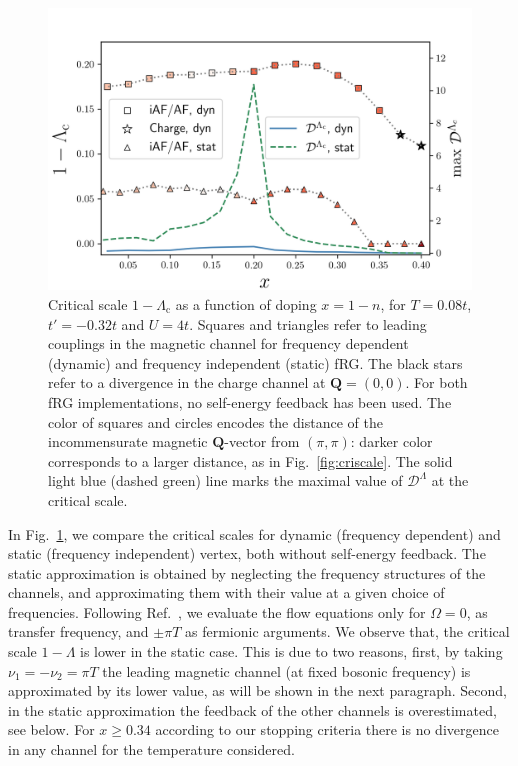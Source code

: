 \begin{figure}
\includegraphics[width=0.5 \textwidth]{images/phasediag_static.png}
\caption{Critical scale $1-\Lambda_{\mathrm{c}}$ as a function of doping $x=1-n$, for $T = 0.08t$, $t'=-0.32t$ and $U=4t$. 
Squares and triangles refer to leading couplings in the magnetic channel for frequency dependent (dynamic) and frequency independent (static) fRG. The black stars refer to a divergence in the charge channel at $\mathbf{Q} = (0,0)$. For both fRG implementations, no self-energy feedback has been used.
The color of squares and circles encodes the distance of the incommensurate magnetic $\mathbf{Q}$-vector from $(\pi,\pi)$: darker color corresponds to a larger distance, as in Fig.~\ref{fig:criscale}.
The solid light blue (dashed green) line marks the maximal value of $\mathcal{D}^\Lambda$ at the critical scale.
}  
\label{fig:PDstatic}
\end{figure} 

In Fig.~\ref{fig:PDstatic}, we compare the critical scales for dynamic (frequency dependent) and static (frequency independent) vertex, both without self-energy feedback.
The static approximation is obtained by neglecting the frequency structures of the channels, and approximating them with their value at a given choice of frequencies.
Following Ref.~, we evaluate the flow equations only for $\Omega=0$, as transfer frequency, and $\pm \pi T$ as fermionic arguments. 
We observe that, the critical scale $1-\Lambda$ is lower in the static case. This is due to two reasons, first, by taking $\nu_1=-\nu_2=\pi T$ the leading magnetic channel (at fixed bosonic frequency) is approximated by its lower value, as will be shown in the next paragraph. Second, in the static approximation the feedback of the other channels is overestimated, see below.
For $x \ge 0.34$ according to our stopping criteria there is no divergence in any channel for the temperature considered. 
  
